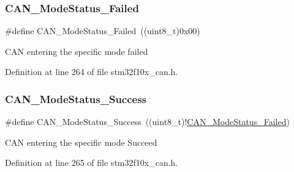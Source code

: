\subsubsection{\texorpdfstring{C\+A\+N\+\_\+\+Mode\+Status\+\_\+\+Failed}{CAN\_ModeStatus\_Failed}}
{\footnotesize\ttfamily \#define C\+A\+N\+\_\+\+Mode\+Status\+\_\+\+Failed~((uint8\+\_\+t)0x00)}

C\+AN entering the specific mode failed 

Definition at line 264 of file stm32f10x\+\_\+can.\+h.

\mbox{\label{group___c_a_n___mode___status_ga7ca0ea503eb3b3a7c0abdfad27cb6579}} 
\subsubsection{\texorpdfstring{C\+A\+N\+\_\+\+Mode\+Status\+\_\+\+Success}{CAN\_ModeStatus\_Success}}
{\footnotesize\ttfamily \#define C\+A\+N\+\_\+\+Mode\+Status\+\_\+\+Success~((uint8\+\_\+t)!\hyperlink{group___c_a_n___mode___status_ga9882944537945325ef08e1986838ea45}{C\+A\+N\+\_\+\+Mode\+Status\+\_\+\+Failed})}

C\+AN entering the specific mode Succeed 

Definition at line 265 of file stm32f10x\+\_\+can.\+h.

